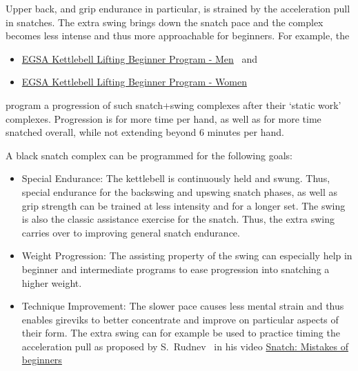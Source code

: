 \documentclass[a4paper,11pt,oneside]{article}
\begin{document}
Upper back, and grip endurance in particular, is strained by the acceleration pull 
in snatches. The extra swing brings down the snatch pace and the complex becomes 
less intense and thus more approachable for beginners.
For example, the 
\begin{itemize}
  \item \href{https://www.elitegirevoy.com/kettlebell-lifting-beginners-program-men/}
         {EGSA Kettlebell Lifting Beginner Program - Men}~
         \cite{egsa_kb_lifting_beginner_program_men} and
  \item \href{https://www.elitegirevoy.com/kettlebell-lifting-beginners-program-women/}
         {EGSA Kettlebell Lifting Beginner Program - Women}~
         \cite{egsa_kb_lifting_beginner_program_women}
\end{itemize}
program a progression of such snatch+swing complexes after their `static work' 
complexes. Progression is for more time per hand, as well as for more time snatched 
overall, while not extending beyond 6 minutes per hand.

A black snatch complex can be programmed for the following goals:

\begin{itemize}

  \item{Special Endurance:} The kettlebell is continuously held and swung. Thus, 
  special endurance for the backswing and upswing snatch phases, as well as grip 
  strength can be trained at less intensity and for a longer set. The swing is also 
  the classic assistance exercise for the snatch. Thus, the extra swing carries over 
  to improving general snatch endurance.
  
  \item{Weight Progression:} The assisting property of the swing can especially help 
  in beginner and intermediate programs to ease progression into snatching a higher 
  weight.
  
  \item{Technique Improvement:} The slower pace causes less mental strain and thus 
  enables gireviks to better concentrate and improve on particular aspects of their 
  form. The extra swing can for example be used to practice timing the acceleration 
  pull as proposed by S.~Rudnev~\cite{rkbyten_snatch_beginner_mistakes} in his video 
  \href{https://youtu.be/N186yUP9LcU?t=89}{Snatch: Mistakes of beginners}  

\end{itemize}
\end{document}
